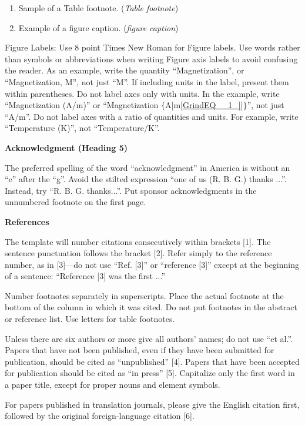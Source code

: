 \documentclass{article} %
\begin{document}
\begin{enumerate}
\item  Sample of a Table footnote. (\textit{Table footnote})

\item  Example of a figure caption. (\textit{figure caption})
\end{enumerate}

Figure Labels: Use 8 point Times New Roman for Figure labels. Use words rather than symbols or abbreviations when writing Figure axis labels to avoid confusing the reader. As an example, write the quantity ``Magnetization'', or ``Magnetization, M'', not just ``M''. If including units in the label, present them within parentheses. Do not label axes only with units. In the example, write ``Magnetization (A/m)'' or ``Magnetization $\mathrm{\{}$A[m\eqref{GrindEQ__1_}]$\mathrm{\}}$'', not just ``A/m''. Do not label axes with a ratio of quantities and units. For example, write ``Temperature (K)'', not ``Temperature/K''.

\noindent 
{\bf Acknowledgment (Heading 5)}

The preferred spelling of the word ``acknowledgment'' in America is without an ``e'' after the ``g''. Avoid the stilted expression ``one of us (R. B. G.) thanks ...''.  Instead, try ``R. B. G. thanks...''. Put sponsor acknowledgments in the unnumbered footnote on the first page.

\noindent 
{\bf References}

The template will number citations consecutively within brackets [1]. The sentence punctuation follows the bracket [2]. Refer simply to the reference number, as in [3]---do not use ``Ref. [3]'' or ``reference [3]'' except at the beginning of a sentence: ``Reference [3] was the first ...''

Number footnotes separately in superscripts. Place the actual footnote at the bottom of the column in which it was cited. Do not put footnotes in the abstract or reference list. Use letters for table footnotes.

Unless there are six authors or more give all authors' names; do not use ``et al.''. Papers that have not been published, even if they have been submitted for publication, should be cited as ``unpublished'' [4]. Papers that have been accepted for publication should be cited as ``in press'' [5]. Capitalize only the first word in a paper title, except for proper nouns and element symbols.

For papers published in translation journals, please give the English citation first, followed by the original foreign-language citation [6].
\end{document}

